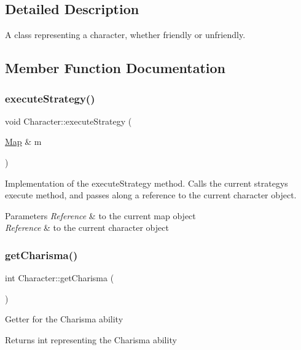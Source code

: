\subsection{Detailed Description}
A class representing a character, whether friendly or unfriendly. 

\subsection{Member Function Documentation}
\hypertarget{classCharacter_a67e50bbbfdf69cce320c1b5079f5f052}{}\label{classCharacter_a67e50bbbfdf69cce320c1b5079f5f052} 
\subsubsection{\texorpdfstring{execute\+Strategy()}{executeStrategy()}}
{\footnotesize\ttfamily void Character\+::execute\+Strategy (\begin{DoxyParamCaption}\item[{\hyperlink{classMap}{Map} \&}]{m }\end{DoxyParamCaption})}

Implementation of the execute\+Strategy method. Calls the current strategy\textquotesingle{}s execute method, and passes along a reference to the current character object. 
\begin{DoxyParams}{Parameters}
{\em Reference} & to the current map object \\
\hline
{\em Reference} & to the current character object \\
\hline
\end{DoxyParams}
\hypertarget{classCharacter_af03c7318bd3015262a0f4873b74a1d51}{}\label{classCharacter_af03c7318bd3015262a0f4873b74a1d51} 
\subsubsection{\texorpdfstring{get\+Charisma()}{getCharisma()}}
{\footnotesize\ttfamily int Character\+::get\+Charisma (\begin{DoxyParamCaption}{ }\end{DoxyParamCaption})}

Getter for the Charisma ability \begin{DoxyReturn}{Returns}
int representing the Charisma ability 
\end{DoxyReturn}
\hypertarget{classCharacter_a2f731997fba7630b66c0686ee2c10a8f}{}\label{classCharacter_a2f731997fba7630b66c0686ee2c10a8f} 
